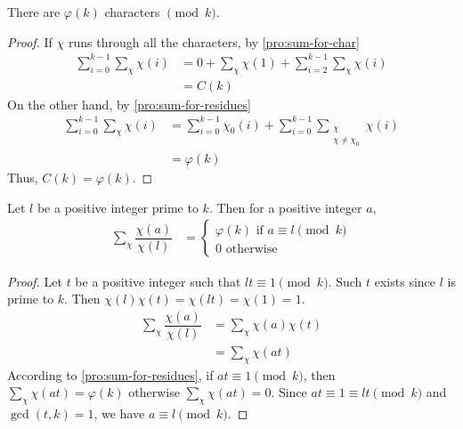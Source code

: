 \documentclass[elemannt.tex]{subfile}
\begin{document}
		\begin{proposition}
			There are $\varphi(k)$ characters $\pmod{k}$.
		\end{proposition}

		\begin{proof}
			If $\chi$ runs through all the characters, by \autoref{pro:sum-for-char}
				\begin{align*}
					\sum_{i=0}^{k-1}\sum_{\chi}\chi(i)
						& = 0+\sum_{\chi}\chi(1)+\sum_{i=2}^{k-1}\sum_{\chi}\chi(i)\\
						& = C(k)
				\end{align*}
			On the other hand, by \autoref{pro:sum-for-residues}
				\begin{align*}
					\sum_{i=0}^{k-1}\sum_{\chi}\chi(i)
						& = \sum_{i=0}^{k-1}\chi_{0}(i)+\sum_{i=0}^{k-1}\sum_{\substack{\chi\\\chi\neq\chi_{0}}}\chi(i)\\
						& = \varphi(k)
				\end{align*}
			Thus, $C(k)=\varphi(k)$.
		\end{proof}

		\begin{proposition}\label{prop:moduluscharacter}
			Let $l$ be a positive integer prime to $k$. Then for a positive integer $a$,
				\begin{align*}
					\sum_{\chi}\dfrac{\chi(a)}{\chi(l)}
						& =
							\begin{cases}
								\varphi(k)\mbox{ if }a\equiv l\pmod{k}\\
								0\mbox{ otherwise}
							\end{cases}
				\end{align*}
		\end{proposition}

		\begin{proof}
			Let $t$ be a positive integer such that $lt\equiv1\pmod{k}$. Such $t$ exists since $l$ is prime to $k$. Then $\chi(l)\chi(t)=\chi(lt)=\chi(1)=1$.
				\begin{align*}
					\sum_{\chi}\dfrac{\chi(a)}{\chi(l)}
						& = \sum_{\chi}\chi(a)\chi(t)\\
						& = \sum_{\chi}\chi(at)
				\end{align*}
			According to \autoref{pro:sum-for-residues}, if $at\equiv1\pmod{k}$, then $\sum_{\chi}\chi(at)=\varphi(k)$ otherwise $\sum_{\chi}\chi(at)=0$. Since $at\equiv1\equiv lt\pmod{k}$ and $\gcd(t,k)=1$, we have $a\equiv l\pmod{k}$.
		\end{proof}
\end{document}
